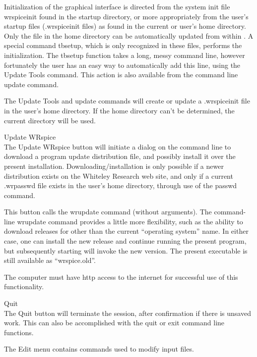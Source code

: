 \begin{description}
Initialization of the graphical interface is directed from the system
init file {\vt wrspiceinit} found in the startup directory, or more
appropriately from the user's startup files ({\vt .wrspiceinit} files)
as found in the current or user's home directory.  Only the file in
the home directory can be automatically updated from within
{\WRspice}.  A special command {\vt tbsetup}, which is only recognized
in these files, performs the initialization.  The {\vt tbsetup}
function takes a long, messy command line, however fortunately the
user has an easy way to automatically add this line, using the
{\cb Update Tools} command.  This action is also available from the
command line {\cb update} command.

The {\cb Update Tools} and {\cb update} commands will create or update
a {\vt .wrspiceinit} file in the user's home directory.  If the home
directory can't be determined, the current directory will be used.

\item{\cb Update WRspice}\\
The {\cb Update WRspice} button will initiate a dialog on the command
line to download a program update distribution file, and possibly
install it over the present installation.  Downloading/installation is
only possible if a newer distribution exists on the Whiteley Research
web site, and only if a current {\vt .wrpasswd} file exists in the
user's home directory, through use of the {\cb passwd} command.

This button calls the {\cb wrupdate} command (without arguments).  The
command-line {\cb wrupdate} command provides a little more
flexibility, such as the ability to download releases for other than
the current ``operating system'' name.  In either case, one can
install the new release and continue running the present program, but
subsequently starting {\WRspice} will invoke the new version.  The
present executable is still available as ``{\vt wrspice.old}''.

The computer must have http access to the internet for successful use
of this functionality.

\item{\cb Quit}\\
The {\cb Quit} button will terminate the {\WRspice} session, after
confirmation if there is unsaved work.  This can also be accomplished
with the {\cb quit} or {\cb exit} command line functions.
\end{description}

The {\cb Edit} menu contains commands used to modify input files.

